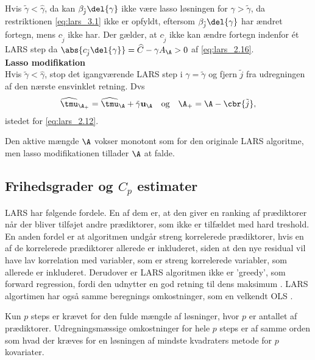 Hvis \(\tilde{\gamma} < \widehat{\gamma}\), da kan \(\beta_{\tilde{j}} \del{\gamma}\) ikke være lasso løsningen for \(\gamma > \tilde{\gamma}\), da restriktionen \eqref{eq:lars_3.1} ikke er opfyldt, eftersom \(\beta_{\tilde{j}} \del{\gamma}\) har ændret fortegn, mens \(c_{\tilde{j}}\) ikke har.
Der gælder, at \(c_{\tilde{j}}\) ikke kan ændre fortegn indenfor ét LARS step da \(\abs{c_{\tilde{j}} \del{\gamma}} = \widehat{C} - \gamma A_\A> 0\) af \eqref{eq:lars_2.16}. \\[2mm]
%
\textbf{Lasso modifikation} \\
Hvis \(\tilde{\gamma} < \widehat{\gamma}\), stop det igangværende LARS step i \(\gamma = \tilde{\gamma}\) og fjern \(\tilde{j}\) fra udregningen af den nærste ensvinklet retning.
Dvs
\begin{align*}
\widehat{\tmu}_{\A_+} = \widehat{\tmu}_\A + \tilde{\gamma} \mathbf{u}_\A \quad \text{og} \quad \A_+ = \A - \cbr{\tilde{j}},
\end{align*}
istedet for \eqref{eq:lars_2.12}.

Den aktive mængde \(\A\) vokser monotont som for den originale LARS algoritme, men lasso modifikationen tillader \(\A\) at falde.

\subsection{Frihedsgrader og \(C_p\) estimater}





LARS har følgende fordele.
En af dem er, at den giver en ranking af prædiktorer når der bliver tilføjet andre prædiktorer, som ikke er tilfældet med hard treshold. 
En anden fordel er at algoritmen undgår streng korrelerede prædiktorer, hvis en af de korrelerede prædiktorer allerede er inkluderet, siden at den nye residual vil have lav korrelation med variabler, som er streng korrelerede variabler, som allerede er inkluderet. 
Derudover er LARS algoritmen ikke er 'greedy', som forward regression, fordi den udnytter en god retning til dens maksimum . 
LARS algortimen har også samme beregnings omkostninger, som en velkendt OLS \citep{hui_hastie}. 


Kun \(p\) steps er krævet for den fulde mængde af løsninger, hvor \(p\) er antallet af prædiktorer.
Udregningsmæssige omkostninger for hele \(p\) steps er af samme orden som hvad der kræves for en løsningen af mindste kvadraters metode for \(p\) kovariater.

 

